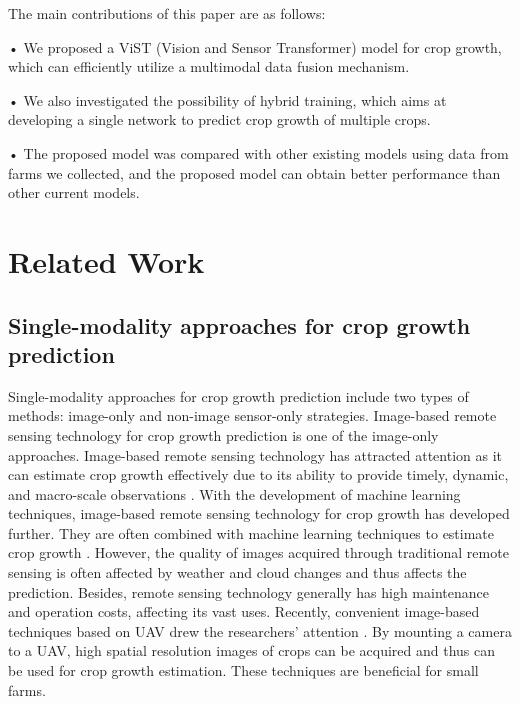 \documentclass[acmsmall,manuscript, screen, review]{acmart}
\begin{document}
The main contributions of this paper are as follows:

•	We proposed a ViST (Vision and Sensor Transformer) model for crop growth, which can efficiently utilize a multimodal data fusion mechanism. 

•	We also investigated the possibility of hybrid training, which aims at developing a single network to predict crop growth of multiple crops.  

•	The proposed model was compared with other existing models using data from farms we collected, and the proposed model can obtain better performance than other current models.





\section{Related Work}
\subsection{Single-modality approaches for crop growth prediction}
Single-modality approaches for crop growth prediction include two types of methods: image-only and non-image sensor-only strategies. Image-based remote sensing technology for crop growth prediction is one of the image-only approaches. Image-based remote sensing technology has attracted attention as it can estimate crop growth effectively due to its ability to provide timely, dynamic, and macro-scale observations \cite{__2016}. With the development of machine learning techniques, image-based remote sensing technology for crop growth has developed further. They are often combined with machine learning techniques to estimate crop growth \cite{johnson_crop_2016,zhong_deep_2019,yang_deep_2019}. However, the quality of images acquired through traditional remote sensing is often affected by weather and cloud changes and thus affects the prediction. Besides, remote sensing technology generally has high maintenance and operation costs, affecting its vast uses. Recently, convenient image-based techniques based on UAV drew the researchers’ attention \cite{weiss_plant_2011,tao_estimation_2020,zhou_predicting_2017,maimaitijiang_unmanned_2017,wan_grain_2020}. By mounting a camera to a UAV, high spatial resolution images of crops can be acquired and thus can be used for crop growth estimation. These techniques are beneficial for small farms.
\end{document}
